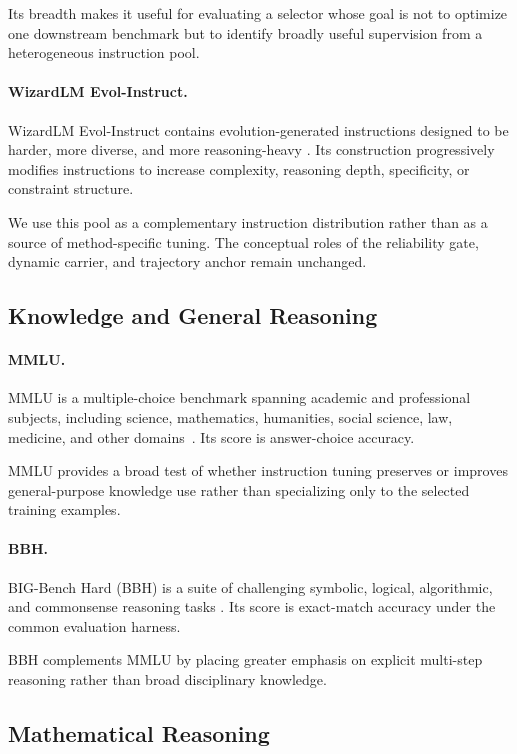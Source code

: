 Its breadth makes it useful for evaluating a selector whose goal is
not to optimize one downstream benchmark but to identify broadly
useful supervision from a heterogeneous instruction pool.


\paragraph{WizardLM Evol-Instruct.}
WizardLM Evol-Instruct contains evolution-generated instructions
designed to be harder, more diverse, and more reasoning-heavy
\cite{xu2024wizardlm}. Its construction progressively modifies
instructions to increase complexity, reasoning depth, specificity, or
constraint structure.

We use this pool as a complementary instruction distribution rather
than as a source of method-specific tuning. The conceptual roles of
the reliability gate, dynamic carrier, and trajectory anchor remain
unchanged.


\subsection{Knowledge and General Reasoning}
\label{app:benchmark-knowledge}

\paragraph{MMLU.}
MMLU is a multiple-choice benchmark spanning academic and professional
subjects, including science, mathematics, humanities, social science,
law, medicine, and other domains~\cite{hendrycks2021mmlu}. Its score
is answer-choice accuracy.

MMLU provides a broad test of whether instruction tuning preserves or
improves general-purpose knowledge use rather than specializing only
to the selected training examples.


\paragraph{BBH.}
BIG-Bench Hard (BBH) is a suite of challenging symbolic, logical,
algorithmic, and commonsense reasoning tasks
\cite{suzgun2022bbh}. Its score is exact-match accuracy under the
common evaluation harness.

BBH complements MMLU by placing greater emphasis on explicit
multi-step reasoning rather than broad disciplinary knowledge.


\subsection{Mathematical Reasoning}
\label{app:benchmark-math}

